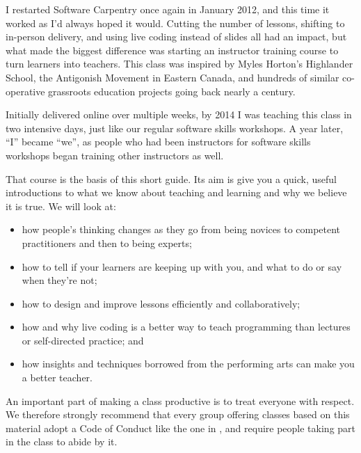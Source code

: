 I restarted Software Carpentry once again in January 2012, and this
time it worked as I'd always hoped it would.  Cutting the number of
lessons, shifting to in-person delivery, and using live coding instead
of slides all had an impact, but what made the biggest difference was
starting an instructor training course to turn learners into teachers.
This class was inspired by Myles Horton's Highlander School, the
Antigonish Movement in Eastern Canada, and hundreds of similar
co-operative grassroots education projects going back nearly a
century.

Initially delivered online over multiple weeks, by 2014 I was teaching
this class in two intensive days, just like our regular software
skills workshops.  A year later, ``I'' became ``we'', as people who
had been instructors for software skills workshops began training
other instructors as well.

That course is the basis of this short guide.  Its aim is give you a
quick, useful introductions to what we know about teaching and
learning and why we believe it is true.  We will look at:

\begin{itemize}

\item
  how people's thinking changes as they go from being novices to
  competent practitioners and then to being experts;

\item
  how to tell if your learners are keeping up with you, and what to
  do or say when they're not;

\item
  how to design and improve lessons efficiently and collaboratively;

\item
  how and why live coding is a better way to teach programming than
  lectures or self-directed practice; and

\item
  how insights and techniques borrowed from the performing arts can
  make you a better teacher.

\end{itemize}




An important part of making a class productive is to treat everyone
with respect.  We therefore strongly recommend that every group
offering classes based on this material adopt a Code of Conduct like
the one in , and require people taking part in the
class to abide by it.

